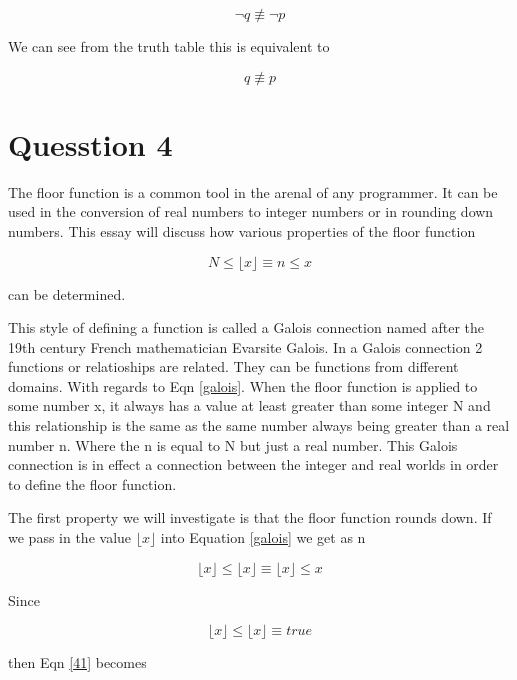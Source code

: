 \documentclass[10pt,a4paper]{article}
\providecommand{\floor}[1]{\lfloor #1 \rfloor  }
\begin{document}
\begin{equation}
\neg q \not\equiv \neg p
\end{equation}

We can see from the truth table this is equivalent to


\begin{equation}
q \not\equiv p
\end{equation}




\section{Quesstion 4}

The floor function is a common tool in the arenal of any programmer. It can be used in the conversion of real numbers to integer numbers or in rounding down numbers. This essay will discuss how various properties of the floor function

\begin{equation}
N \le \floor{x} \equiv n \le x
\label{galois}
\end{equation}

can be determined.

This style of defining a function is called a Galois connection named after the 19th century French mathematician Evarsite Galois. In a Galois connection 2 functions or relatioships are related. They can be functions from different domains. With regards to Eqn \ref{galois}. When the floor function is applied to some number x, it always has a value at least greater than some integer N and this relationship is the same as the same number always being greater than a real number n. Where the n is equal to N but just a real number. This Galois connection is in effect a connection between the integer and real worlds in order to define the floor function.

The first property we will investigate is that the floor function rounds down. If we pass in the value $\floor{x}$ into Equation \ref{galois} we get as n

\begin{equation}
\floor{x} \le \floor{x} \equiv \floor{x} \le x
\label{41}
\end{equation}

Since 

\begin{equation}
\floor{x} \le \floor{x} \equiv true
\end{equation}

then Eqn \ref{41} becomes
\end{document}
